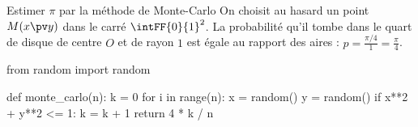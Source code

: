 \begin{exercice}[3]{Estimer $\pi$ par la méthode de Monte-Carlo}
On choisit au hasard un point $M(x\pv y)$ dans le carré $\intFF{0}{1}^{2}$. La probabilité qu'il tombe dans le quart de disque de centre
$O$ et de rayon $1$ est égale au rapport des aires : $p=\frac{\pi/4}{1}=\frac{\pi}{4}$.
\begin{codecote}[0.5]
\begin{pythoncol}
from random import random

def monte_carlo(n):
    k = 0
    for i in range(n):
        x = random()
        y = random()
        if x**2 + y**2 <= 1:
            k = k + 1
    return 4 * k / n
\end{pythoncol}
\cote
\centering
\begin{tikzpicture}
\begin{axis}[otSchema, width=52mm, height=52mm, xmin=0, xmax=1, ymin=0, ymax=1, xtick={0,1}, ytick={1},
  axis lines=box, axis line style={otMuted,line width=0.5pt,-}]

\end{axis}
\end{tikzpicture}
\end{codecote}
\end{exercice}
